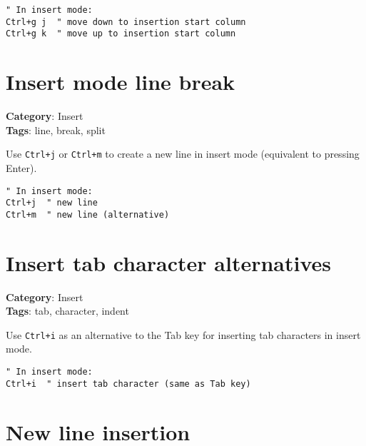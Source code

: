 {{{{{{\begin{Exa*}{}
\begin{Verbatim}[fontsize=\footnotesize, breaklines, breakanywhere]
" In insert mode:
Ctrl+g j  " move down to insertion start column
Ctrl+g k  " move up to insertion start column
\end{Verbatim}
\end{Exa*}

\section{Insert mode line break}

\textbf{Category}: Insert\\ \textbf{Tags}: line, break, split
\vspace{0.5cm}

Use {\footnotesize \Verb§Ctrl+j§} or {\footnotesize \Verb§Ctrl+m§} to create a new line in insert mode (equivalent to pressing Enter).

\begin{Exa*}{}
\begin{Verbatim}[fontsize=\footnotesize, breaklines, breakanywhere]
" In insert mode:
Ctrl+j  " new line
Ctrl+m  " new line (alternative)
\end{Verbatim}
\end{Exa*}

\section{Insert tab character alternatives}

\textbf{Category}: Insert\\ \textbf{Tags}: tab, character, indent
\vspace{0.5cm}

Use {\footnotesize \Verb§Ctrl+i§} as an alternative to the Tab key for inserting tab characters in insert mode.

\begin{Exa*}{}
\begin{Verbatim}[fontsize=\footnotesize, breaklines, breakanywhere]
" In insert mode:
Ctrl+i  " insert tab character (same as Tab key)
\end{Verbatim}
\end{Exa*}

\section{New line insertion}

}}}}}}
